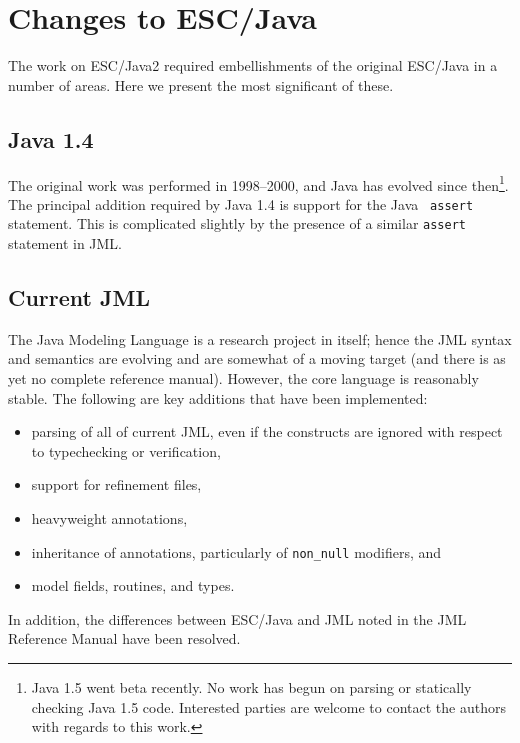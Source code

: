 \documentclass{acm_proc_article-sp}
\begin{document}
\section{Changes to ESC/Java}

The work on ESC/Java2 required embellishments of the original ESC/Java
in a number of areas.  Here we present the most significant of these.
\subsection{Java 1.4}
The original work was performed in 1998--2000, and Java has evolved
since then\footnote{Java 1.5 went beta recently.  No work has begun on
  parsing or statically checking Java 1.5 code.  Interested parties
  are welcome to contact the authors with regards to this work.}.  The
principal addition required by Java 1.4 is support for the Java {\tt
  assert} statement.  This is complicated slightly by the presence of
a similar \texttt{assert} statement in JML.

\subsection{Current JML}
The Java Modeling Language is a research project in itself; hence the
JML syntax and semantics are evolving and are somewhat of a moving
target (and there is as yet no complete reference manual).  However,
the core language is reasonably stable.  The following are key
additions that have been implemented:
\setlength{\partopsep}{0in}\setlength{\parskip}{0in}\setlength{\itemsep}{0in}\setlength{\topsep}{0in}
\begin{itemize}
\setlength{\partopsep}{0in}\setlength{\parskip}{0in}\setlength{\itemsep}{0in}\setlength{\topsep}{0in}
\item parsing of all of current JML, even if the constructs are
  ignored with respect to typechecking or verification,
\item support for refinement files,
\item heavyweight annotations,
\item inheritance of annotations, particularly of \texttt{non\_null}
  modifiers, and
\item model fields, routines, and types.
\end{itemize}
In addition, the differences between ESC/Java and JML noted in the JML
Reference Manual have been resolved.
\end{document}
